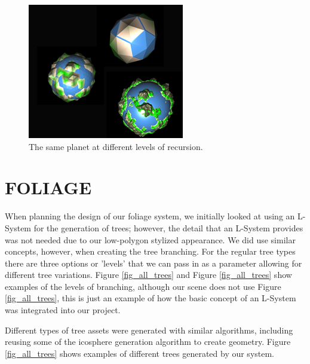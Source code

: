\documentclass[a4paper,twoside]{article}
\begin{document}
\begin{figure}
\centering
\includegraphics[scale=0.75]{./images/planets/planets.png}
\caption{The same planet at different levels of recursion.}
\label{fig_iterations}
\end{figure}

\section{\uppercase{Foliage}}
\label{sec:fol}
\noindent When planning the design of our foliage system, we initially looked at using an L-System for the generation of trees; however, the detail that an L-System provides was not needed due to our low-polygon stylized appearance. We did use similar concepts, however, when creating the tree branching. 
For the regular tree types there are three options or 'levels' that we can pass in as a parameter allowing for different tree variations. Figure \ref{fig_all_trees} and Figure \ref{fig_all_trees} show examples of the levels of branching, although our scene does not use Figure \ref{fig_all_trees}, this is just an example of how the basic concept of an L-System was integrated into our project.

Different types of tree assets were generated with similar algorithms, including reusing some of the icosphere generation algorithm to create geometry. Figure \ref{fig_all_trees} shows examples of different trees generated by our system.
\end{document}
